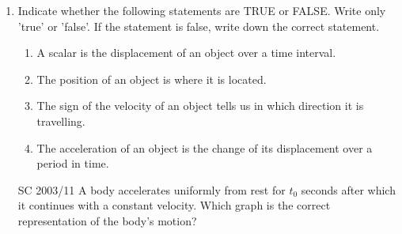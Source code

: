 \begin{enumerate}[noitemsep, label=\textbf{\arabic*}. ]
    \par
          \label{m38796*uid181}\item Indicate whether the following statements are TRUE or FALSE. Write only 'true' or 'false'. If the statement is false, write down the correct statement.
\label{m38796*id81564}\begin{enumerate}[noitemsep, label=\textbf{\alph*}. ] 
            \label{m38796*uid182}\item A scalar is the displacement of an object over a time interval.
\label{m38796*uid183}\item The position of an object is where it is located.
\label{m38796*uid184}\item The sign of the velocity of an object tells us in which direction it is travelling.
\label{m38796*uid185}\item The acceleration of an object is the change of its displacement over a period in time.
\end{enumerate}
                \label{m38796*uid186}\item [SC 2003/11] A body accelerates uniformly from rest for \begin{math}{t}_{0}\end{math} seconds after which it continues with a constant velocity. Which graph is the correct representation of the body's motion?

    
      
    
    \setlength\mytablespace{8\tabcolsep}
    \addtolength\mytablespace{5\arrayrulewidth}
    \setlength\mytablewidth{\linewidth}
        

\end{enumerate}
